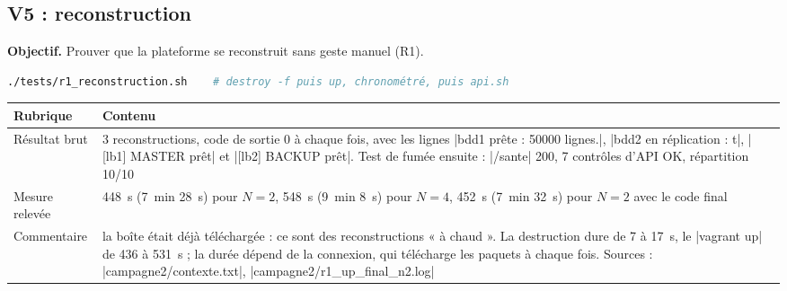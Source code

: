 \documentclass[a4paper,11pt]{article}
\begin{document}
\subsection{V5 : reconstruction}
\textbf{Objectif.} Prouver que la plateforme se reconstruit sans geste manuel (R1).
\begin{lstlisting}[language=bash]
./tests/r1_reconstruction.sh    # destroy -f puis up, chronométré, puis api.sh
\end{lstlisting}
{\small
\begin{longtable}{@{}L{3.2cm}L{12.4cm}@{}}
\toprule
\textbf{Rubrique} & \textbf{Contenu}\\ \midrule\endhead
Résultat brut & 3 reconstructions, code de sortie 0 à chaque fois, avec les lignes |bdd1 prête : 50000 lignes.|, |bdd2 en réplication : t|, |[lb1] MASTER prêt| et |[lb2] BACKUP prêt|. Test de fumée ensuite : |/sante| 200, 7 contrôles d'API OK, répartition 10/10\\
Mesure relevée & 448~s (7~min 28~s) pour $N=2$, 548~s (9~min 8~s) pour $N=4$, 452~s (7~min 32~s) pour $N=2$ avec le code final\\
Commentaire & la boîte était déjà téléchargée : ce sont des reconstructions « à chaud ». La destruction dure de 7 à 17~s, le |vagrant up| de 436 à 531~s ; la durée dépend de la connexion, qui télécharge les paquets à chaque fois. Sources : |campagne2/contexte.txt|, |campagne2/r1_up_final_n2.log|\\
\bottomrule
\end{longtable}}

\end{document}
